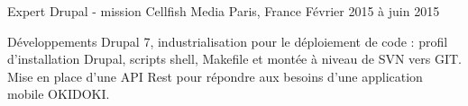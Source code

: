 \cventry
{Expert Drupal - mission} %
{Cellfish Media} %
{Paris, France} %
{Février 2015 à juin 2015} %
{
\begin{cvitems} %
    \item
    {
        Développements Drupal 7, industrialisation pour le déploiement de code : profil d'installation Drupal,
        scripts shell, Makefile et montée à niveau de SVN vers GIT. Mise en place d'une API Rest pour répondre
        aux besoins d'une application mobile OKIDOKI.
    }
\end{cvitems}
}
